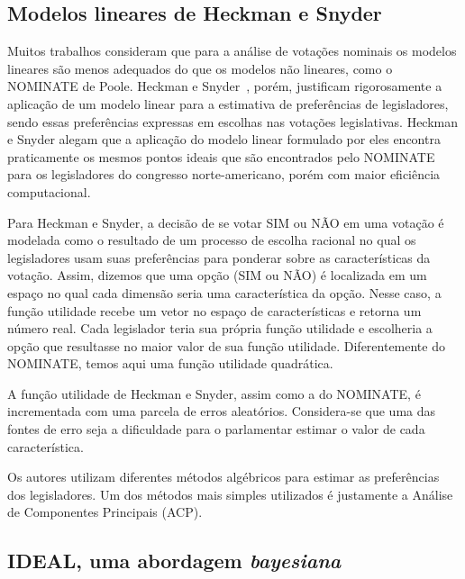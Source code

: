 \documentclass[
	article,			%
	12pt,				%
	oneside,			%
	a4paper,			%
	english,			%
	brazil,				%
	sumario=tradicional,
	oldfontcommands %
	]{abntex2}
\newcommand\nay{NÃO\xspace}
\newcommand\yea{SIM\xspace}
\newcommand\nominate{NOMINATE\xspace}
\begin{document}
\subsection{Modelos lineares de Heckman e Snyder}

Muitos trabalhos consideram que para a análise de votações nominais os modelos lineares são menos adequados do que os modelos não lineares, como o \nominate de Poole. Heckman e Snyder~\cite{heckman-snyder1997}, porém, justificam rigorosamente a aplicação de um modelo linear para a estimativa de preferências de legisladores, sendo essas preferências expressas em escolhas nas votações legislativas. Heckman e Snyder alegam que a aplicação do modelo linear formulado por eles encontra praticamente os mesmos pontos ideais que são encontrados pelo \nominate para os legisladores do congresso norte-americano, porém com maior eficiência computacional.

Para Heckman e Snyder, a decisão de se votar \yea ou \nay em uma votação é modelada como o resultado de um processo de escolha racional no qual os legisladores usam suas preferências para ponderar sobre as características da votação. Assim, dizemos que uma opção (\yea ou \nay) é localizada em um espaço no qual cada dimensão seria uma característica da opção. Nesse caso, a função utilidade recebe um vetor no espaço de características e retorna um número real. Cada legislador teria sua própria função utilidade e escolheria a opção que resultasse no maior valor de sua função utilidade. Diferentemente do NOMINATE, temos aqui uma função utilidade quadrática.

A função utilidade de Heckman e Snyder, assim como a do NOMINATE, é incrementada com uma parcela de erros aleatórios. Considera-se que uma das fontes de erro seja a dificuldade para o parlamentar estimar o valor de cada característica. 

Os autores utilizam diferentes métodos algébricos para estimar as preferências dos legisladores. Um dos métodos mais simples utilizados é justamente a Análise de Componentes Principais (ACP). 

\subsection{IDEAL, uma abordagem \emph{bayesiana}}
\end{document}
